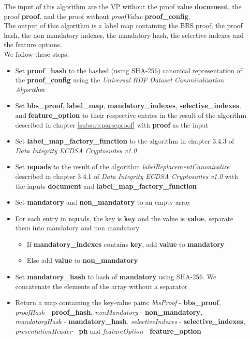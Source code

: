 \documentclass[
	a4paper               %
	,BCOR=0mm            %
	,bibliography=totoc   %
	,listof=totoc         %
	,monolingual
	,twoside=false
]{bfhthesis}              %
\begin{document}
The input of this algorithm are the VP without the proof value \textbf{document}, the proof \textbf{proof}, and the proof without \textit{proofValue} \textbf{proof\_config}.\\

The output of this algorithm is a label map containing the BBS proof, the proof hash, the non mandatory indexes, the mandatory hash, the selective indexes and the feature options.\\

We follow these steps:
\begin{itemize}
	\item Set \textbf{proof\_hash} to the hashed (using SHA-256) canonical representation of the \textbf{proof\_config} using the \textit{Universal RDF Dataset Canonicalization Algorithm}\cite{rdf}
	\item Set \textbf{bbs\_proof}, \textbf{label\_map}, \textbf{mandatory\_indexes}, \textbf{selective\_indexes}, \textbf{} and \textbf{feature\_option} to their respective entries in the result of the algorithm described in chapter \ref{subsub:parseproof} with \textbf{proof} as the input
	\item Set \textbf{label\_map\_factory\_function} to the algorithm in chapter 3.4.3 of \textit{Data Integrity ECDSA Cryptosuites v1.0}\cite{ecdsa}
	\item Set \textbf{nquads} to the result of the algorithm \textit{labelReplacementCanonicalize} described in chapter 3.4.1 of \textit{Data Integrity ECDSA Cryptosuites v1.0}\cite{ecdsa} with the inputs \textbf{document} and \textbf{label\_map\_factory\_function}
	\item Set \textbf{mandatory} and \textbf{non\_mandatory} to an empty array
	\item For each entry in nquads, the key is \textbf{key} and the value is \textbf{value}, separate them into mandatory and non mandatory
	\begin{itemize}
		\item If \textbf{mandatory\_indexes} contains \textbf{key}, add \textbf{value} to \textbf{mandatory}
		\item Else add \textbf{value} to \textbf{non\_mandatory}
	\end{itemize}
	\item Set \textbf{mandatory\_hash} to hash of \textbf{mandatory} using SHA-256. We concatenate the elements of the array without a separator
	\item Return a map containing the key-value pairs: \textit{bbsProof} - \textbf{bbs\_proof}, \textit{proofHash} - \textbf{proof\_hash}, \textit{nonMandatory} - \textbf{non\_mandatory}, \textit{mandatoryHash} - \textbf{mandatory\_hash}, \textit{selectiveIndexes} - \textbf{selective\_indexes}, \textit{presentationHeader} - \textbf{ph} and \textit{featureOption} - \textbf{feature\_option}
\end{itemize}
\end{document}
